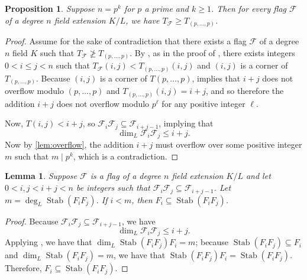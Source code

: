 \documentclass[letterpaper,10pt]{amsart}
\DeclareMathOperator{\Stab}{Stab}
\newcommand{\cF}{\mathcal{F}}
\newtheorem{lemma}[theorem]{Lemma}
\newtheorem{proposition}[theorem]{Proposition}
\theoremstyle{definition}
\theoremstyle{remark}
\begin{document}
\begin{proposition}
\label{prop:prime-power}
Suppose $n = p^k$ for $p$ a prime and $k \geq 1$. Then for every flag $\cF$ of a degree $n$ field extension $K/L$, we have $T_{\cF} \geq T_{(p,\dots,p)}$.
\end{proposition}
\begin{proof}
Assume for the sake of contradiction that there exists a flag $\cF$ of a degree $n$ field $K$ such that $T_{\cF} \not \geq T_{(p,\dots,p)}$. By , as in the proof of , there exists integers $0 < i \leq j < n$ such that $T_{\cF}(i,j) < T_{(p,\dots,p)}(i,j)$ and $(i,j)$ is a corner of $T_{(p,\dots,p)}$. Because $(i,j)$ is a corner of $T(p,\dots,p)$,  implies that $i+j$ does not overflow modulo $(p,\dots,p)$ and $T_{(p,\dots,p)}(i,j) = i+j$, and so therefore the addition $i + j$ does not overflow modulo $p^{\ell}$ for any positive integer $\ell$. 

Now, $T(i,j) < i+j$, so $\cF_i\cF_j \subseteq \cF_{i + j - 1}$, implying that 
\[
    \dim_{L}\cF_i \cF_j \leq i + j.
\]
Now by \cref{lem:overflow}, the addition $i + j$ must overflow over some positive integer $m$ such that $m \mid p^k$, which is a contradiction.
\end{proof}

\begin{lemma}
\label{lem:i-leq-m}
Suppose $\cF$ is a flag of a degree $n$ field extension $K/L$ and let $0 < i, j < i + j < n$ be integers such that $\cF_i \cF_j \subseteq \cF_{i+j-1}$. Let $m = \deg_{L}\Stab(F_i F_j)$. If $i < m$, then $F_i \subseteq \Stab(F_iF_j)$.
\end{lemma}
\begin{proof}
Because $\cF_i \cF_j \subseteq \cF_{i+j-1}$, we have
\[
    \dim_{L}\cF_i \cF_j \leq i+j.
\]
Applying , we have that $\dim_{L}\Stab(F_iF_j)F_{i} = m$; because $\Stab(F_iF_j) \subseteq F_{i}$ and $\dim_{L}\Stab(F_iF_j) = m$, we have that $\Stab(F_iF_j)F_{i} = \Stab(F_iF_j)$. Therefore, $F_{i} \subseteq \Stab(F_iF_j)$. 
\end{proof}
\end{document}
